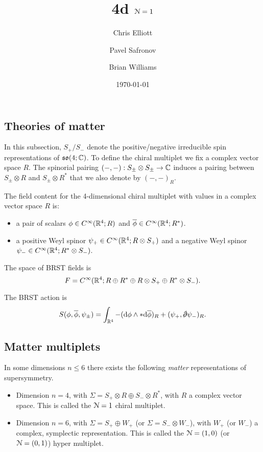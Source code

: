 \documentclass[10pt, oneside]{article}
\title{4d $\mathcal N=1$}
\author{Chris Elliott\and Pavel Safronov \and Brian Williams}
\date{\today}
\begin{document}
\maketitle

\subsection{Theories of matter}
In this subsection, $S_+ / S_-$ denote the positive/negative irreducible spin representations of $\mathfrak{so}(4; \mathbb C)$. 
To define the chiral multiplet we fix a complex vector space $R$.
The spinorial pairing $(-,-) : S_\pm \otimes S_\pm \to \mathbb C$ induces a pairing between $S_\pm \otimes R$ and $S_{\pm} \otimes R^*$ that we also denote by $(-,-)_R$. 

The field content for the 4-dimensional chiral multiplet with values in a complex vector space $R$ is:
\begin{itemize}
\item a pair of scalars $\phi \in C^\infty(\mathbb R^4 ; R)$ and $\overline{\phi} \in C^\infty(\mathbb R^4 ; R^*)$.
\item a positive Weyl spinor $\psi_+ \in C^\infty(\mathbb R^4 ; R \otimes S_+)$ and a negative Weyl spinor $\psi_- \in C^\infty(\mathbb R^4 ; R^* \otimes S_-)$.
\end{itemize}

The space of BRST fields is 
\[
F = C^\infty(\mathbb R^4 ; R \oplus R^* \oplus R \otimes S_+ \oplus R^* \otimes S_-) .
\]

The BRST action is
\[
S (\phi, \Bar{\phi}, \psi_\pm) = \int_{\RR^4}  - (\d \phi \wedge * \d \Bar{\phi})_R + (\psi_+ , \sd \dd \psi_-)_R .
\]

\subsection{Matter multiplets}

In some dimensions $n \leq 6$ there exists the following {\em matter} representations of supersymmetry. 

\begin{itemize}
\item Dimension $n=4$, with $\Sigma = S_+ \otimes R \oplus S_- \otimes R^*$, with $R$ a complex vector space.
This is called the $\mathcal N=1$ chiral multiplet.
\item Dimension $n=6$, with $\Sigma = S_+ \oplus W_+$ (or $\Sigma = S_- \otimes W_-$), with $W_+$ (or $W_-$) a complex, symplectic representation. This is called the $\mathcal N=(1,0)$ (or $\mathcal N=(0,1)$) hyper multiplet. 
\end{itemize}
\end{document}
